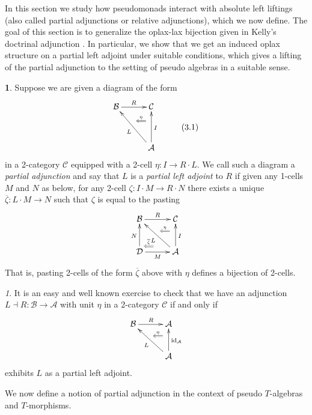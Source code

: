\documentclass[a4paper,oneside,english]{amsart}
\numberwithin{equation}{section}
\numberwithin{figure}{section}
\theoremstyle{plain}
\theoremstyle{definition}
\newtheorem{defn}[thm]{\protect\definitionname}
\theoremstyle{remark}
\newtheorem{rem}[thm]{\protect\remarkname}
\theoremstyle{definition}
\theoremstyle{plain}
\theoremstyle{plain}
\theoremstyle{plain}
\providecommand{\definitionname}{Definition}
\providecommand{\remarkname}{Remark}
\begin{document}
In this section we study how pseudomonads interact with absolute left
liftings (also called partial adjunctions or relative adjunctions),
which we now define. The goal of this section is to generalize the
oplax-lax bijection given in Kelly's doctrinal adjunction \cite{doctrinal}.
In particular, we show that we get an induced oplax structure on a
partial left adjoint under suitable conditions, which gives a lifting
of the partial adjunction to the setting of pseudo algebras in a suitable
sense. 
\begin{defn}
Suppose we are given a diagram of the form
\[
\xymatrix@=1em{\mathcal{B}\ar[rr]^{R} &  & \mathcal{C}\ar@{}[ld]|-{\stackrel{\eta}{\Longleftarrow}}\\
 & \; &  &  & (3.1)\\
 &  & \mathcal{A}\ar[uu]_{I}\ar[uull]^{L}
}
\]
in a 2-category $\mathscr{C}$ equipped with a 2-cell $\eta:I\to R\cdot L$.
We call such a diagram a \emph{partial adjunction} and say that $L$
is a \emph{partial left adjoint} to $R$ if given any 1-cells $M$
and $N$ as below, for any 2-cell $\zeta:I\cdot M\to R\cdot N$ there
exists a unique $\overline{\zeta}:L\cdot M\to N$ such that $\zeta$
is equal to the pasting
\[
\xymatrix@=1em{\mathcal{B}\ar[rr]^{R} &  & \mathcal{C}\ar@{}[ld]|-{\stackrel{\eta}{\Longleftarrow}}\\
 & \;\ar@{}[ld]|-{\stackrel{\overline{\zeta}}{\Longleftarrow}\;}\\
\mathcal{D}\ar[rr]_{M}\ar[uu]^{N} &  & \mathcal{A}\ar[uu]_{I}\ar[uull]^{L}
}
\]
That is, pasting 2-cells of the form $\overline{\zeta}$ above with
$\eta$ defines a bijection of 2-cells.\end{defn}
\begin{rem}
It is an easy and well known exercise to check that we have an adjunction
$L\dashv R:\mathcal{B}\to\mathcal{A}$ with unit $\eta$ in a 2-category
$\mathscr{C}$ if and only if 
\[
\xymatrix@=1em{\mathcal{B}\ar[rr]^{R} &  & \mathcal{A}\ar@{}[ld]|-{\stackrel{\eta}{\Longleftarrow}}\\
 & \;\\
 &  & \mathcal{A}\ar[uu]_{\textnormal{id}_{\mathcal{A}}}\ar[uull]^{L}
}
\]
exhibits $L$ as a partial left adjoint. 
\end{rem}
We now define a notion of partial adjunction in the context of pseudo
$T$-algebras and $T$-morphisms. 
\end{document}
